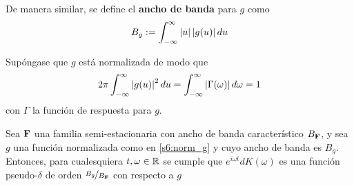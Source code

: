 De manera similar, se define el \textbf{ancho de banda} para $g$ como 
\begin{equation}
B_g := \int_{-\infty}^{\infty} \left| u \right| \left| g(u) \right| du
\end{equation}

Supóngase que $g$ está normalizada de modo que
\begin{equation}
2 \pi \int_{-\infty}^{\infty} \left| g(u) \right|^{2} du = \int_{-\infty}^{\infty} \left| \Gamma(\omega) \right| d\omega = 1
\label{s6:norm_g}
\end{equation}
con $\Gamma$ la función de respuesta para $g$.

\begin{teorema}
Sea $\mathbf{F}$ una familia semi-estacionaria con ancho de banda característico $B_{\mathbf{F}}$, y sea $g$ una función normalizada como en \ref{s6:norm_g} y cuyo ancho de banda es $B_g$. Entonces, para cualesquiera $t, \omega \in \mathbb{R}$ se cumple que $e^{i \omega t} dK(\omega)$ es una función pseudo-$\delta$ de orden $\nicefrac{B_g}{B_{\mathbf{F}}}$ con respecto a $g$
\label{teo:s6:lema}
\end{teorema}
